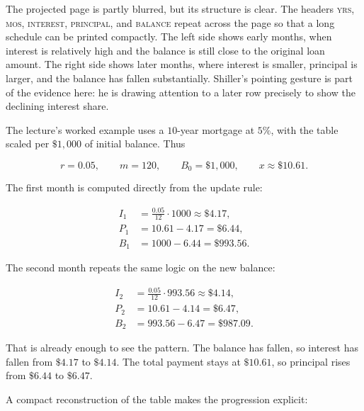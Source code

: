The projected page is partly blurred, but its structure is clear. The headers \textsc{yrs}, \textsc{mos}, \textsc{interest}, \textsc{principal}, and \textsc{balance} repeat across the page so that a long schedule can be printed compactly. The left side shows early months, when interest is relatively high and the balance is still close to the original loan amount. The right side shows later months, where interest is smaller, principal is larger, and the balance has fallen substantially. Shiller's pointing gesture is part of the evidence here: he is drawing attention to a later row precisely to show the declining interest share.

The lecture's worked example uses a \(10\)-year mortgage at \(5\%\), with the table scaled per \(\$1{,}000\) of initial balance. Thus

\begin{equation}
r = 0.05, \qquad m = 120, \qquad B_0 = \$1{,}000, \qquad x \approx \$10.61.
\end{equation}

The first month is computed directly from the update rule:

\begin{align}
I_1 &= \frac{0.05}{12}\cdot 1000 \approx \$4.17, \\
P_1 &= 10.61 - 4.17 = \$6.44, \\
B_1 &= 1000 - 6.44 = \$993.56.
\end{align}

The second month repeats the same logic on the new balance:

\begin{align}
I_2 &= \frac{0.05}{12}\cdot 993.56 \approx \$4.14, \\
P_2 &= 10.61 - 4.14 = \$6.47, \\
B_2 &= 993.56 - 6.47 = \$987.09.
\end{align}

That is already enough to see the pattern. The balance has fallen, so interest has fallen from \(\$4.17\) to \(\$4.14\). The total payment stays at \(\$10.61\), so principal rises from \(\$6.44\) to \(\$6.47\).

A compact reconstruction of the table makes the progression explicit:


